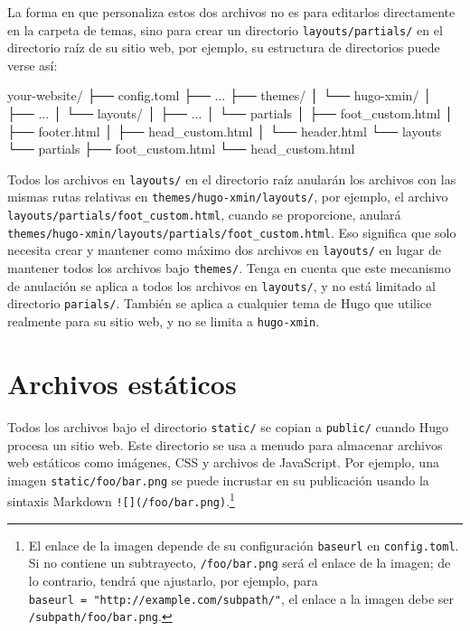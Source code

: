 \documentclass[12pt,]{krantz}
\makeatletter
\newenvironment{Shaded}{\begin{snugshade}}{\end{snugshade}}
\newcommand{\ExtensionTok}[1]{#1}
\newcommand{\NormalTok}[1]{#1}
\newenvironment{kframe}{%
\medskip{}
\setlength{\fboxsep}{.8em}
 \def\at@end@of@kframe{}%
 \ifinner\ifhmode%
  \def\at@end@of@kframe{\end{minipage}}%
  \begin{minipage}{\columnwidth}%
 \fi\fi%
 \def\FrameCommand##1{\hskip\@totalleftmargin \hskip-\fboxsep
 \colorbox{shadecolor}{##1}\hskip-\fboxsep
     \hskip-\linewidth \hskip-\@totalleftmargin \hskip\columnwidth}%
 \MakeFramed {\advance\hsize-\width
   \@totalleftmargin\z@ \linewidth\hsize
   \@setminipage}}%
 {\par\unskip\endMakeFramed%
 \at@end@of@kframe}
\renewenvironment{Shaded}{\begin{kframe}}{\end{kframe}}
\theoremstyle{definition}
\theoremstyle{definition}
\theoremstyle{definition}
\theoremstyle{remark}
\makeatother
\begin{document}
La forma en que personaliza estos dos archivos no es para editarlos
directamente en la carpeta de temas, sino para crear un directorio
\texttt{layouts/partials/} en el directorio raíz de su sitio web, por
ejemplo, su estructura de directorios puede verse así:

\begin{Shaded}
\begin{Highlighting}[]
\ExtensionTok{your-website/}
\NormalTok{├── }\ExtensionTok{config.toml}
\NormalTok{├── }\ExtensionTok{...}
\NormalTok{├── }\ExtensionTok{themes/}
\NormalTok{│   └── }\ExtensionTok{hugo-xmin/}
\NormalTok{│       ├── }\ExtensionTok{...}
\NormalTok{│       └── }\ExtensionTok{layouts/}
\NormalTok{│           ├── }\ExtensionTok{...}
\NormalTok{│           └── }\ExtensionTok{partials}
\NormalTok{│               ├── }\ExtensionTok{foot_custom.html}
\NormalTok{│               ├── }\ExtensionTok{footer.html}
\NormalTok{│               ├── }\ExtensionTok{head_custom.html}
\NormalTok{│               └── }\ExtensionTok{header.html}
\NormalTok{└── }\ExtensionTok{layouts}
\NormalTok{    └── }\ExtensionTok{partials}
\NormalTok{        ├── }\ExtensionTok{foot_custom.html}
\NormalTok{        └── }\ExtensionTok{head_custom.html}
\end{Highlighting}
\end{Shaded}

Todos los archivos en \texttt{layouts/} en el directorio raíz anularán
los archivos con las mismas rutas relativas en
\texttt{themes/hugo-xmin/layouts/}, por ejemplo, el archivo
\texttt{layouts/partials/foot\_custom.html}, cuando se proporcione,
anulará \texttt{themes/hugo-xmin/layouts/partials/foot\_custom.html}.
Eso significa que solo necesita crear y mantener como máximo dos
archivos en \texttt{layouts/} en lugar de mantener todos los archivos
bajo \texttt{themes/}. Tenga en cuenta que este mecanismo de anulación
se aplica a todos los archivos en \texttt{layouts/}, y no está limitado
al directorio \texttt{parials/}. También se aplica a cualquier tema de
Hugo que utilice realmente para su sitio web, y no se limita a
\texttt{hugo-xmin}.

\hypertarget{archivos-estaticos}{%
\section{Archivos estáticos}\label{archivos-estaticos}}

Todos los archivos bajo el directorio
\texttt{static/} se copian a \texttt{public/}
cuando Hugo procesa un sitio web. Este directorio se usa a menudo para
almacenar archivos web estáticos como imágenes, CSS y archivos de
JavaScript. Por ejemplo, una imagen \texttt{static/foo/bar.png} se puede
incrustar en su publicación usando la sintaxis Markdown
\texttt{!{[}{]}(/foo/bar.png)}.\footnote{El enlace de la imagen depende
  de su configuración \texttt{baseurl} en \texttt{config.toml}. Si no
  contiene un subtrayecto, \texttt{/foo/bar.png} será el enlace de la
  imagen; de lo contrario, tendrá que ajustarlo, por ejemplo, para
  \texttt{baseurl\ =\ "http://example.com/subpath/"}, el enlace a la
  imagen debe ser \texttt{/subpath/foo/bar.png}.}
\end{document}
